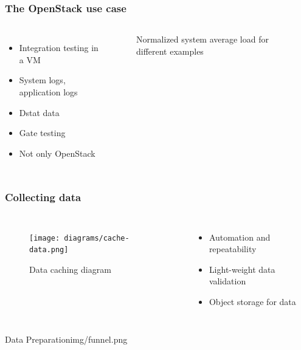 \documentclass[aspectratio=169,11pt,hyperref={colorlinks=true}]{beamer}
\begin{document}
\begin{frame}
    \frametitle{The OpenStack use case}
    \begin{columns}
        \begin{itemize}
            \item{Integration testing in a VM}
            \item{System logs, application logs}
            \item{Dstat data}
            \item{Gate testing}
            \item{Not only OpenStack}
        \end{itemize}
        \begin{figure}
        \begin{center}
            \caption{Normalized system average load for different examples}
        \end{center}
        \end{figure}
    \end{columns}
\end{frame}

\begin{frame}
    \frametitle{Collecting data}
    \begin{columns}
        \begin{figure}
        \begin{center}
          \texttt{[image: diagrams/cache-data.png]}
             \caption{Data caching diagram}
        \end{center}
        \end{figure}
        \begin{itemize}
            \item{Automation and repeatability}
            \item{Light-weight data validation}
            \item{Object storage for data}
        \end{itemize}
    \end{columns}
\end{frame}

\begin{sectionpic}
{Data Preparation}{img/funnel.png}
\end{sectionpic}
\end{document}
